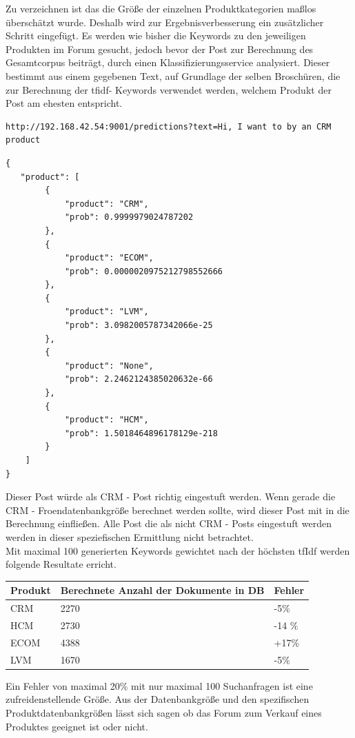 Zu verzeichnen ist das die Größe der einzelnen Produktkategorien maßlos überschätzt wurde. Deshalb wird zur Ergebnisverbesserung ein zusätzlicher Schritt eingefügt. Es werden wie bisher die Keywords zu den jeweiligen Produkten im Forum gesucht, jedoch bevor der Post zur Berechnung des Gesamtcorpus beiträgt, durch einen Klassifizierungsservice analysiert. Dieser bestimmt aus einem gegebenen Text, auf Grundlage der selben Broschüren, die zur Berechnung der tfidf- Keywords verwendet werden, welchem Produkt der Post am ehesten entspricht.

\begin{lstlisting}[language=HTML5]
http://192.168.42.54:9001/predictions?text=Hi, I want to by an CRM product
\end{lstlisting}

\begin{lstlisting}[language=HTML5]
{
   "product": [
        {
            "product": "CRM",
            "prob": 0.9999979024787202
        },
        {
            "product": "ECOM",
            "prob": 0.0000020975212798552666
        },
        {
            "product": "LVM",
            "prob": 3.0982005787342066e-25
        },
        {
            "product": "None",
            "prob": 2.2462124385020632e-66
        },
        {
            "product": "HCM",
            "prob": 1.5018464896178129e-218
        }
    ]
}
\end{lstlisting}

Dieser Post würde als CRM - Post richtig eingestuft werden. Wenn gerade die CRM - Froendatenbankgröße berechnet werden sollte, wird dieser Post mit in die Berechnung einfließen. Alle Post die als nicht CRM - Posts eingestuft werden werden in dieser speziefischen Ermittlung nicht betrachtet.\\
Mit maximal 100 generierten Keywords gewichtet nach der höchsten tfIdf werden folgende Resultate erricht.

\begin{tabular}{ | p{3cm} | l | l |}
\hline
Produkt & Berechnete Anzahl der Dokumente in DB & Fehler \\ \hline
CRM & 2270 & -5\% \\ \hline
HCM & 2730 & -14 \% \\ \hline
ECOM & 4388 & +17\% \\ \hline
LVM & 1670 & -5\% \\ \hline
\end{tabular}

Ein Fehler von maximal 20\% mit nur maximal 100 Suchanfragen ist eine zufreidenstellende Größe. Aus der Datenbankgröße und den spezifischen Produktdatenbankgrößen lässt sich sagen ob das Forum zum Verkauf eines Produktes geeignet ist oder nicht.